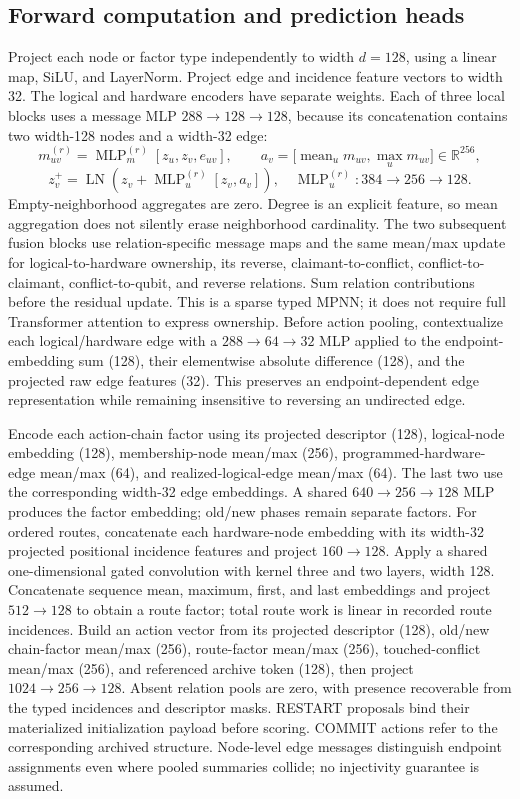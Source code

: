 \subsection{Forward computation and prediction heads}

Project each node or factor type independently to width \(d=128\), using a linear map, SiLU, and LayerNorm. Project edge and incidence feature vectors to width 32. The logical and hardware encoders have separate weights. Each of three local blocks uses a message MLP \(288\!\to\!128\!\to\!128\), because its concatenation contains two width-128 nodes and a width-32 edge:
\[
 m_{uv}^{(r)}=\operatorname{MLP}^{(r)}_m
 [z_u,z_v,e_{uv}],\qquad
 a_v=\bigl[\operatorname{mean}_{u}m_{uv},
             \operatorname{max}_{u}m_{uv}\bigr]\in\mathbb R^{256},
\]
\[
 z_v^+=\operatorname{LN}\!\left(z_v+
 \operatorname{MLP}^{(r)}_u[z_v,a_v]\right),
 \quad \operatorname{MLP}^{(r)}_u:384\to256\to128.
\]
Empty-neighborhood aggregates are zero. Degree is an explicit feature, so mean aggregation does not silently erase neighborhood cardinality. The two subsequent fusion blocks use relation-specific message maps and the same mean/max update for logical-to-hardware ownership, its reverse, claimant-to-conflict, conflict-to-claimant, conflict-to-qubit, and reverse relations. Sum relation contributions before the residual update. This is a sparse typed MPNN; it does not require full Transformer attention to express ownership. Before action pooling, contextualize each logical/hardware edge with a \(288\to64\to32\) MLP applied to the endpoint-embedding sum (128), their elementwise absolute difference (128), and the projected raw edge features (32). This preserves an endpoint-dependent edge representation while remaining insensitive to reversing an undirected edge.

Encode each action-chain factor using its projected descriptor (128), logical-node embedding (128), membership-node mean/max (256), programmed-hardware-edge mean/max (64), and realized-logical-edge mean/max (64). The last two use the corresponding width-32 edge embeddings. A shared \(640\to256\to128\) MLP produces the factor embedding; old/new phases remain separate factors. For ordered routes, concatenate each hardware-node embedding with its width-32 projected positional incidence features and project \(160\to128\). Apply a shared one-dimensional gated convolution with kernel three and two layers, width 128. Concatenate sequence mean, maximum, first, and last embeddings and project \(512\to128\) to obtain a route factor; total route work is linear in recorded route incidences. Build an action vector from its projected descriptor (128), old/new chain-factor mean/max (256), route-factor mean/max (256), touched-conflict mean/max (256), and referenced archive token (128), then project \(1024\to256\to128\). Absent relation pools are zero, with presence recoverable from the typed incidences and descriptor masks. RESTART proposals bind their materialized initialization payload before scoring. COMMIT actions refer to the corresponding archived structure. Node-level edge messages distinguish endpoint assignments even where pooled summaries collide; no injectivity guarantee is assumed.

